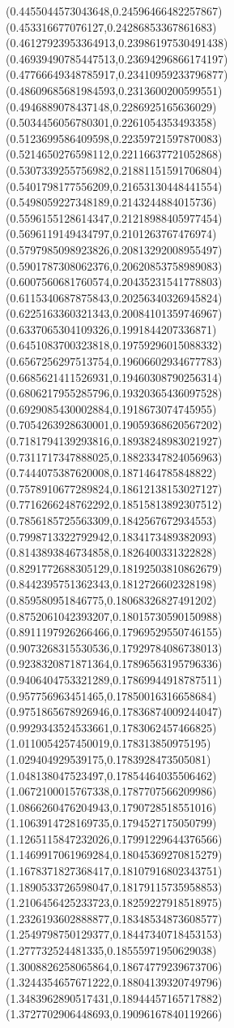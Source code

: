 {(0.4455044573043648,0.24596466482257867)
(0.453316677076127,0.24286853367861683)
(0.46127923953364913,0.23986197530491438)
(0.46939490785447513,0.23694296866174197)
(0.47766649348785917,0.23410959233796877)
(0.48609685681984593,0.2313600200599551)
(0.4946889078437148,0.2286925165636029)
(0.5034456056780301,0.2261054353493358)
(0.5123699586409598,0.22359721597870083)
(0.5214650276598112,0.22116637721052868)
(0.5307339255756982,0.21881151591706804)
(0.5401798177556209,0.21653130448441554)
(0.5498059227348189,0.2143244884015736)
(0.5596155128614347,0.21218988405977454)
(0.5696119149434797,0.2101263767476974)
(0.5797985098923826,0.20813292008955497)
(0.5901787308062376,0.20620853758989083)
(0.6007560681760574,0.20435231541778803)
(0.6115340687875843,0.20256340326945824)
(0.6225163360321343,0.20084101359746967)
(0.6337065304109326,0.1991844207336871)
(0.6451083700323818,0.19759296015088332)
(0.6567256297513754,0.19606602934677783)
(0.6685621411526931,0.19460308790256314)
(0.6806217955285796,0.19320365436097528)
(0.6929085430002884,0.1918673074745955)
(0.7054263928630001,0.19059368620567202)
(0.7181794139293816,0.18938248983021927)
(0.7311717347888025,0.18823347824056963)
(0.7444075387620008,0.1871464785848822)
(0.7578910677289824,0.18612138153027127)
(0.7716266248762292,0.18515813892307512)
(0.7856185725563309,0.1842567672934553)
(0.7998713322792942,0.1834173489382093)
(0.8143893846734858,0.1826400331322828)
(0.8291772688305129,0.18192503810862679)
(0.8442395751362343,0.1812726602328198)
(0.859580951846775,0.18068326827491202)
(0.8752061042393207,0.18015730590150988)
(0.8911197926266466,0.17969529550746155)
(0.9073268315530536,0.17929784086738013)
(0.9238320871871364,0.17896563195796336)
(0.9406404753321289,0.17869944918787511)
(0.957756963451465,0.17850016316658684)
(0.9751865678926946,0.17836874009244047)
(0.9929343524533661,0.1783062457466825)
(1.0110054257450019,0.178313850975195)
(1.029404929539175,0.1783928473505081)
(1.048138047523497,0.17854464035506462)
(1.0672100015767338,0.1787707566209986)
(1.0866260476204943,0.1790728518551016)
(1.1063914728169735,0.1794527175050799)
(1.1265115847232026,0.17991229644376566)
(1.1469917061969284,0.18045369270815279)
(1.1678371827368417,0.18107916802343751)
(1.1890533726598047,0.18179115735958853)
(1.2106456425233723,0.18259227918518975)
(1.2326193602888877,0.18348534873608577)
(1.2549798750129377,0.18447340718453153)
(1.277732524481335,0.18555971950629038)
(1.3008826258065864,0.18674779239673706)
(1.3244354657671222,0.18804139320749796)
(1.3483962890517431,0.18944457165717882)
(1.3727702906448693,0.19096167840119266)
}
